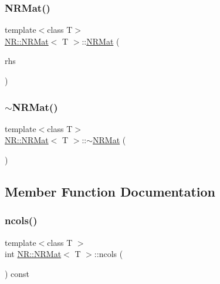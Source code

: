 \mbox{\label{classNR_1_1NRMat_a7ad1dc6f56c44d5d0a7b595d48206cfa}} 
\subsubsection{\texorpdfstring{NRMat()}{NRMat()}\hspace{0.1cm}{\footnotesize\ttfamily [15/15]}}
{\footnotesize\ttfamily template$<$class T$>$ \\
\mbox{\hyperlink{classNR_1_1NRMat}{N\+R\+::\+N\+R\+Mat}}$<$ T $>$\+::\mbox{\hyperlink{classNR_1_1NRMat}{N\+R\+Mat}} (\begin{DoxyParamCaption}\item[{const \mbox{\hyperlink{classNR_1_1NRMat}{N\+R\+Mat}}$<$ T $>$ \&}]{rhs }\end{DoxyParamCaption})}

\mbox{\label{classNR_1_1NRMat_a8b6826b7a7556a397ee7d7ad382e5dae}} 
\subsubsection{\texorpdfstring{$\sim$NRMat()}{~NRMat()}\hspace{0.1cm}{\footnotesize\ttfamily [3/3]}}
{\footnotesize\ttfamily template$<$class T$>$ \\
\mbox{\hyperlink{classNR_1_1NRMat}{N\+R\+::\+N\+R\+Mat}}$<$ T $>$\+::$\sim$\mbox{\hyperlink{classNR_1_1NRMat}{N\+R\+Mat}} (\begin{DoxyParamCaption}{ }\end{DoxyParamCaption})}



\subsection{Member Function Documentation}
\mbox{\label{classNR_1_1NRMat_ad6c5ecfb47d80c934bedeb7ea395fd84}} 
\subsubsection{\texorpdfstring{ncols()}{ncols()}\hspace{0.1cm}{\footnotesize\ttfamily [1/3]}}
{\footnotesize\ttfamily template$<$class T $>$ \\
int \mbox{\hyperlink{classNR_1_1NRMat}{N\+R\+::\+N\+R\+Mat}}$<$ T $>$\+::ncols (\begin{DoxyParamCaption}{ }\end{DoxyParamCaption}) const\hspace{0.3cm}{\ttfamily [inline]}}

